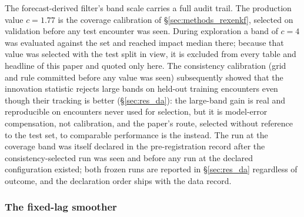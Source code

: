 
The forecast-derived filter's band scale carries a full audit trail. The
production value $c = 1.77$ is the coverage calibration of
\S\ref{sec:methods_rexenkf}, selected on validation before any test encounter
was seen. During exploration a band of $c = 4$ was evaluated against
the \TestSplit{} set and reached \PoneExcludedBandFour{} impact median there; because
that value was selected with the test split in view, it is excluded from
every table and headline of this paper and quoted only here. The
consistency calibration (grid and rule committed before
any value was seen) subsequently showed that the innovation statistic
rejects large bands on held-out training encounters even though their
tracking is better (\S\ref{sec:res_da}): the large-band gain is real and
reproducible on encounters never used for selection, but it is model-error
compensation, not calibration, and the paper's route, selected without reference to the test set, to
comparable performance is the \TwoStageKF{} instead. The \TwoStageKF{}
run at the coverage band was itself declared in the pre-registration
record after the consistency-selected run was seen and before any run at
the declared configuration existed; both frozen runs are reported in
\S\ref{sec:res_da} regardless of outcome, and the declaration order ships
with the data record.\re

\subsubsection*{The fixed-lag smoother}
\label{app:rts}

